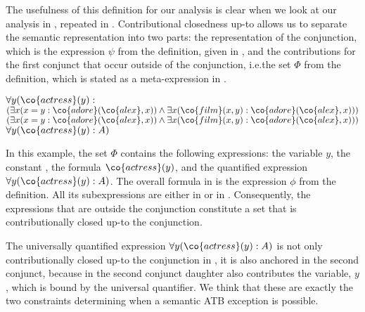 \documentclass[output=paper]{langsci/langscibook}
\begin{document}
The usefulness of this definition for our analysis is clear when we look at our analysis in , repeated in .
Contributional closedness up-to allows us to separate the semantic representation into two parts: 
the representation of the conjunction, which is the expression $\psi$ from the definition, given in , and the contributions for the first conjunct that occur outside of the conjunction, i.e.\@ the set $\Phi$ from the definition, which is stated as a meta-expression in .


\ea
\begin{xlist}
\ex 
$\forall y (\co{actress}(y) :$\\
\hspace*{\fill}
$(\exists x (x = y : \co{adore}(\co{alex},x)) \land \exists x (\co{film}(x,y) : \co{adore}(\co{alex},x)))$ \label{ex-phi}
%
\ex $(\exists x (x = y : \co{adore}(\co{alex},x)) \land \exists x (\co{film}(x,y) : \co{adore}(\co{alex},x)))$
\label{ex-psi}
\ex $\forall y (\co{actress}(y) : A)$
\label{ex-PHI}
\end{xlist}
\z 

In this example, the set $\Phi$ contains the following expressions: the variable $y$, the constant , the formula $\co{actress}(y)$, and the quantified expression $\forall y (\co{actress}(y): A)$. 
The overall formula in  is the expression $\phi$ from the definition. 
All its subexpressions are either in  or in .
Consequently, the expressions that are outside the conjunction constitute a set that is contributionally closed up-to the conjunction.

The universally quantified expression $\forall y (\co{actress}(y) : A)$ is not only contributionally closed up-to the conjunction in , it is also anchored in the second conjunct, because  in the second conjunct daughter also contributes the variable, $y$, which is bound by the universal quantifier.
%
We think that these are exactly the two constraints determining when a semantic ATB exception is possible.
\end{document}
